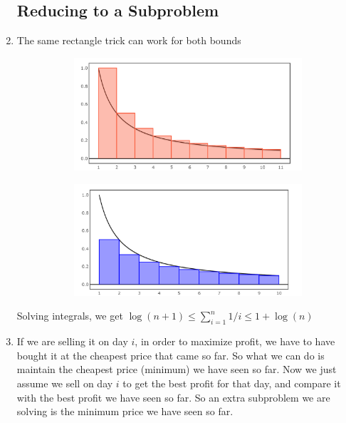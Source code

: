 \documentclass[12pt]{report}
\begin{document}
\begin{enumerate}[label=\textbf{\arabic*.}]
  \subsection*{\huge\bfseries Reducing to a Subproblem}
  \item The same rectangle trick can work for both bounds
    
  \begin{figure}[htbp]
    \begin{subfigure}{0.5\textwidth}
      \includegraphics[width=\linewidth]{1stinequality.png}
    \end{subfigure}%
    \begin{subfigure}{0.5\textwidth}
      \includegraphics[width=\linewidth]{2ndinequality.png}
    \end{subfigure}
  \end{figure}

  Solving integrals, we get $\log(n+1) \leq \sum_{i=1}^{n} 1/i \leq 1+\log(n)$

  \item If we are selling it on day $i$, in order to maximize profit, we have to have bought it at the cheapest
  price that came so far. So what we can do is maintain the cheapest price (minimum) we have seen so far. Now we 
  just assume we sell on day $i$ to get the best profit for that day, and compare it with the best profit we have 
  seen so far. So an extra subproblem we are solving is the minimum price we have seen so far.


\end{enumerate}
\end{document}
